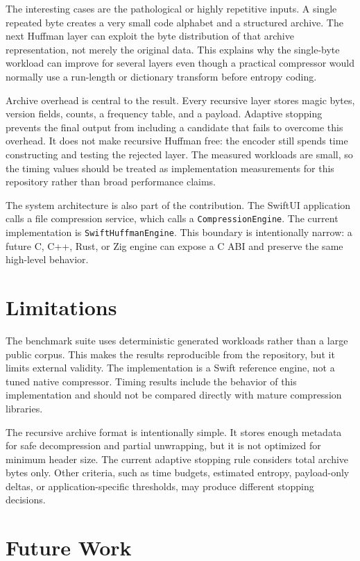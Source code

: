 \documentclass[conference]{IEEEtran}
\begin{document}
The interesting cases are the pathological or highly repetitive inputs. A single repeated byte creates a very small code alphabet and a structured archive. The next Huffman layer can exploit the byte distribution of that archive representation, not merely the original data. This explains why the single-byte workload can improve for several layers even though a practical compressor would normally use a run-length or dictionary transform before entropy coding.

Archive overhead is central to the result. Every recursive layer stores magic bytes, version fields, counts, a frequency table, and a payload. Adaptive stopping prevents the final output from including a candidate that fails to overcome this overhead. It does not make recursive Huffman free: the encoder still spends time constructing and testing the rejected layer. The measured workloads are small, so the timing values should be treated as implementation measurements for this repository rather than broad performance claims.

The system architecture is also part of the contribution. The SwiftUI application calls a file compression service, which calls a \texttt{CompressionEngine}. The current implementation is \texttt{SwiftHuffmanEngine}. This boundary is intentionally narrow: a future C, C++, Rust, or Zig engine can expose a C ABI and preserve the same high-level behavior.

\section{Limitations}

The benchmark suite uses deterministic generated workloads rather than a large public corpus. This makes the results reproducible from the repository, but it limits external validity. The implementation is a Swift reference engine, not a tuned native compressor. Timing results include the behavior of this implementation and should not be compared directly with mature compression libraries.

The recursive archive format is intentionally simple. It stores enough metadata for safe decompression and partial unwrapping, but it is not optimized for minimum header size. The current adaptive stopping rule considers total archive bytes only. Other criteria, such as time budgets, estimated entropy, payload-only deltas, or application-specific thresholds, may produce different stopping decisions.

\section{Future Work}
\end{document}
